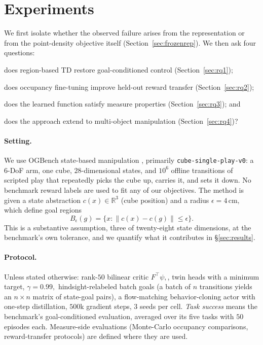 \documentclass{article}
\newcommand{\cube}{c}
\begin{document}
\section{Experiments}
\label{sec:experiments}

We first isolate whether the observed failure arises from the representation or from the point-density objective itself (Section~\ref{sec:frozenrep}).
We then ask four questions: 
\begin{inparaenum}
    \item does region-based TD restore goal-conditioned control (Section~\ref{sec:rq1});
    \item does occupancy fine-tuning improve held-out reward transfer (Section~\ref{sec:rq2});
    \item does the learned function satisfy measure properties (Section~\ref{sec:rq3}); and
    \item  does the approach extend to multi-object manipulation (Section~\ref{sec:rq4})?
\end{inparaenum}

\paragraph{Setting.}
We use OGBench state-based manipulation \citep{park2024ogbench}, primarily \texttt{cube-single-play-v0}: a $6$-DoF arm, one cube, $28$-dimensional states, and $10^6$ offline transitions of scripted play that repeatedly picks the cube up, carries it, and sets it down.
No benchmark reward labels are used to fit any of our objectives.
The method is given a state abstraction $\cube(x)\in\mathbb{R}^3$ (cube position) and a radius $\epsilon=4\,\text{cm},$ which define goal regions
\begin{equation}
    B_\epsilon(g)=\{x:\|\cube(x)-\cube(g)\|\le\epsilon\}.
\end{equation}
This is a substantive assumption, three of twenty-eight state dimensions, at the benchmark's own tolerance, and we quantify what it contributes in \S\ref{sec:results}.

\paragraph{Protocol.}
Unless stated otherwise: rank-$50$ bilinear critic $F^\top\psi,$, twin heads with a minimum target, $\gamma=0.99,$ hindsight-relabeled batch goals (a batch of $n$ transitions yields an $n\times n$ matrix of state-goal pairs), a flow-matching behavior-cloning actor with one-step distillation, $500$k gradient steps, $3$ seeds per cell.
\emph{Task success} means the benchmark's goal-conditioned evaluation, averaged over its five tasks with $50$ episodes each.
Measure-side evaluations (Monte-Carlo occupancy comparisons, reward-transfer protocols) are defined where they are used.
\end{document}
